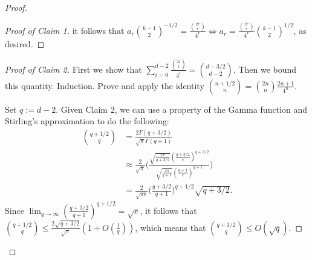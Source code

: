 \documentclass[12]{article}
\DeclareMathOperator{\mult}{mult}
\theoremstyle{definition}
\begin{document}
\begin{proof}
\begin{proof}[Proof of Claim 1]
			it follows that $a_r {k-1 \choose 2}^{-1/2} = \frac{{2r \choose r}}{4^r} \Leftrightarrow a_r = \frac{{2r \choose r}}{4^r} {k-1 \choose 2}^{1/2}$, as desired.
		\end{proof}
		
		\begin{proof}[Proof of Claim 2]
			First we show that $\sum_{i=0}^{d-2} \frac{{2i \choose i}}{4^i} = {d-3/2 \choose d-2}$.  Then we bound this quantity.  Induction.  Prove and apply the identity ${n + 1/2 \choose n} = {2n \choose n}\frac{2n+1}{4^n}$.
			
			Set $q := d-2$.  Given Claim 2, we can use a property of the Gamma function and Stirling's approximation to do the following:
			\begin{align*}
				{q + 1/2 \choose q} &= \frac{2\Gamma(q+3/2)}{\sqrt{\pi}\Gamma(q+1)}	\\
				&\approx \frac{2}{\sqrt{\pi}} \biggr( \frac{\sqrt{\tfrac{2\pi}{q+3/2}} ( \tfrac{q+3/2}{e} )^{q+3/2}}{\sqrt{\tfrac{2\pi}{q+1}} ( \tfrac{q+1}{e})^{q+1}} \biggr)	\\
				&= \frac{2}{\sqrt{\pi e}} \biggr( \frac{q+3/2}{q+1} \biggr)^{q+1/2} \sqrt{q+3/2}.
			\end{align*}
			Since $\lim_{q \rightarrow \infty} (\frac{q+3/2}{q+1})^{q+1/2} = \sqrt{e}$, it follows that ${q + 1/2 \choose q} \leq \frac{2\sqrt{q+3/2}}{\sqrt{\pi}}  (1+O(\tfrac{1}{q}))$, which means that ${q + 1/2 \choose q} \leq O(\sqrt{q})$.
		\end{proof}
		
		
		
	\end{proof}

	
			
\end{document}
